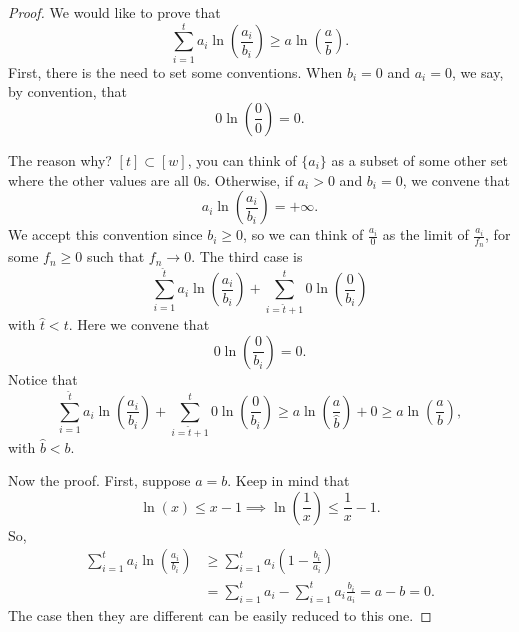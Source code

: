 \begin{proof}
	We would like to prove that
	\begin{equation*}
		\sum_{i= 1}^t a_i \ln \left( \frac{a_i}{b_i} \right)
		\ge
		a \ln \left( \frac{a}{b} \right).
	\end{equation*}
	First, there is the need to set some conventions.
	When $b_i = 0$ and $a_i = 0$, we say, by convention, that
	\begin{equation*}
		0 \ln \left( \frac{0}{0} \right) = 0.
	\end{equation*}
	 
	The reason why?
	$[t] \subset [w]$, you can think of $\{a_i\}$ as a subset of some other set where the other values are all $0$s.
	Otherwise, if $a_i > 0$ and $b_i = 0$, we convene that
	\begin{equation*}
		a_i \ln \left( \frac{a_i}{b_i} \right) = +\infty.
	\end{equation*}
	We accept this convention since $b_i \geq 0$, so we can think of $\frac{a_i}{0}$ as the limit of $\frac{a_i}{f_n}$, for some $f_n \ge 0$ such that $f_n \to 0$.
	The third case is
	\begin{equation*}
	  \sum_{i = 1}^{\hat{t}} a_i \ln \left( \frac{a_i}{b_i} \right)
	  +
	  \sum_{i = \hat{t} + 1}^{t} 0 \ln \left( \frac{0}{b_i} \right)
	\end{equation*}
	with $\hat{t} < t$.
	Here we convene that
	\begin{equation*}
		0 \ln \left( \frac{0}{b_i} \right) = 0.
	\end{equation*}
	Notice that 
	\begin{equation*}
		\sum_{i = 1}^{\hat{t}} a_i \ln \left( \frac{a_i}{b_i} \right)
		+
		\sum_{i = \hat{t} + 1}^{t} 0 \ln \left( \frac{0}{b_i} \right)
		\ge a \ln \left( \frac{a}{\hat{b}} \right) + 0
		\ge a \ln \left( \frac{a}{b} \right),
	\end{equation*}
	with $\hat{b} < b$.

	Now the proof.
	First, suppose $a=b$.
	Keep in mind that
	\begin{equation*}
		\ln(x) \le x - 1
		\implies
		\ln \left( \frac{1}{x} \right) \le \frac{1}{x} - 1.
	\end{equation*}
	So,
	\begin{align*}
		\sum_{i = 1}^{t} a_i \ln \left( \frac{a_i}{b_i} \right)
		& \ge
		\sum_{i = 1}^{t} a_i \left( 1 - \frac{b_i}{a_i} \right)
		\tag{w. eq. iff $a=b$}
		\\
		& =
		\sum_{i = 1}^{t} a_i - \sum_{i = 1}^{t} a_i \frac{b_i}{a_i}
		=
		a - b = 0.
	\end{align*}
	The case then they are different can be easily reduced to this one.


\end{proof}
